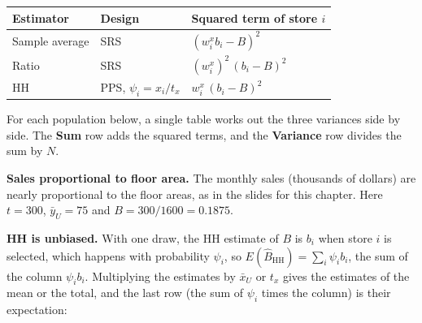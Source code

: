 \documentclass[
  letterpaper,
  DIV=11,
  numbers=noendperiod]{scrreprt}
\newcounter{none} %
\renewcommand{\[}{\begin{equation}}
\renewcommand{\]}{\end{equation}}
\begin{document}
{\def\LTcaptype{none} %
\begin{longtable}[]{@{}lll@{}}
\toprule\noalign{}
Estimator & Design & Squared term of store \(i\) \\
\midrule\noalign{}
\endhead
\bottomrule\noalign{}
\endlastfoot
Sample average & SRS & \((w^x_ib_i-B)^2\) \\
Ratio & SRS & \((w^x_i)^2\,(b_i-B)^2\) \\
HH & PPS, \(\psi_i=x_i/t_x\) & \(w^x_i\,(b_i-B)^2\) \\
\end{longtable}
}

For each population below, a single table works out the three variances
side by side. The \textbf{Sum} row adds the squared terms, and the
\textbf{Variance} row divides the sum by \(N\).

\textbf{Sales proportional to floor area.} The monthly sales (thousands
of dollars) are nearly proportional to the floor areas, as in the slides
for this chapter. Here \(t=300\), \(\bar{y}_U=75\) and
\(B=300/1600=0.1875\).

\textbf{HH is unbiased.} With one draw, the HH estimate of \(B\) is
\(b_i\) when store \(i\) is selected, which happens with probability
\(\psi_i\), so \(E(\hat{B}_{\mathrm{HH}})=\sum_i\psi_ib_i\), the sum of
the column \(\psi_ib_i\). Multiplying the estimates by \(\bar{x}_U\) or
\(t_x\) gives the estimates of the mean or the total, and the last row
(the sum of \(\psi_i\) times the column) is their expectation:
\end{document}
